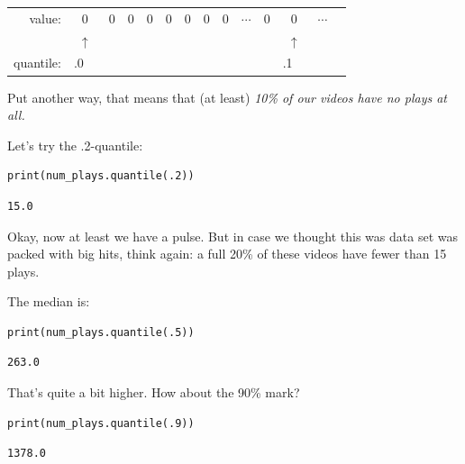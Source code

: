 \begin{center}
\renewcommand{\arraystretch}{.7}
\begin{tabular}{rccccccccccccc}
value: & 0& 0& 0& 0& 0& 0& 0& 0& $\cdots$ & 0 & 0 & $\cdots$ \\
& $\uparrow$ & & & & & & & & & & $\uparrow$ & \\
quantile: & .0\ \ & & & & & & & & & & .1\ \ & \\
\end{tabular}
\end{center}

Put another way, that means that (at least) \textit{10\% of our videos have no
plays at all.}

Let's try the .2-quantile:

\begin{Verbatim}[fontsize=\small,samepage=true,frame=single,framesep=3mm]
print(num_plays.quantile(.2))
\end{Verbatim}
\vspace{-.3in}

\begin{Verbatim}[fontsize=\small,samepage=true,frame=leftline,framesep=5mm,framerule=1mm]
15.0
\end{Verbatim}

Okay, now at least we have a pulse. But in case we thought this was data set
was packed with big hits, think again: a full 20\% of these videos have fewer
than 15 plays.

The median is:

\begin{Verbatim}[fontsize=\small,samepage=true,frame=single,framesep=3mm]
print(num_plays.quantile(.5))
\end{Verbatim}
\vspace{-.3in}

\begin{Verbatim}[fontsize=\small,samepage=true,frame=leftline,framesep=5mm,framerule=1mm]
263.0
\end{Verbatim}

That's quite a bit higher. How about the 90\% mark?

\begin{Verbatim}[fontsize=\small,samepage=true,frame=single,framesep=3mm]
print(num_plays.quantile(.9))
\end{Verbatim}
\vspace{-.3in}

\begin{Verbatim}[fontsize=\small,samepage=true,frame=leftline,framesep=5mm,framerule=1mm]
1378.0
\end{Verbatim}

